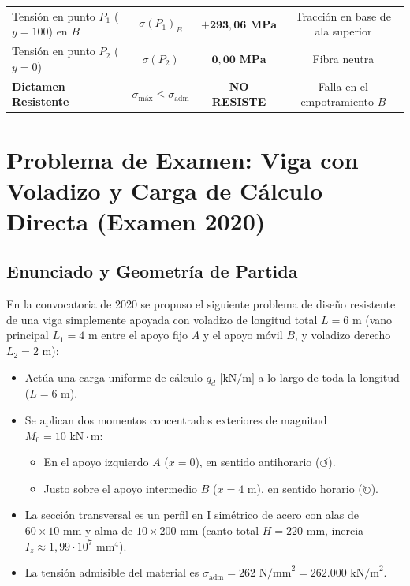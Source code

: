 \begin{table}[H]
{\begin{tabular}{lccc}
            Tensión en punto $P_1$ ($y = 100$) en $B$ & $\sigma(P_1)_B$ & $\mathbf{+293{,}06\text{ MPa}}$ & Tracción en base de ala superior \\
            Tensión en punto $P_2$ ($y = 0$) & $\sigma(P_2)$ & $\mathbf{0{,}00\text{ MPa}}$ & Fibra neutra \\
            \midrule
            \textbf{Dictamen Resistente} & $\sigma_{\text{máx}} \le \sigma_{\text{adm}}$ & \textbf{NO RESISTE} & Falla en el empotramiento $B$ \\
            \bottomrule
        \end{tabular}%
    }
    \label{tab:resumen_viga_apoyada_empotrada_triang}
\end{table}

\section{Problema de Examen: Viga con Voladizo y Carga de Cálculo Directa (Examen 2020)}

\subsection{Enunciado y Geometría de Partida}

En la convocatoria de 2020 se propuso el siguiente problema de diseño resistente de una viga simplemente apoyada con voladizo de longitud total $L = 6\text{ m}$ (vano principal $L_1 = 4\text{ m}$ entre el apoyo fijo $A$ y el apoyo móvil $B$, y voladizo derecho $L_2 = 2\text{ m}$):
\begin{itemize}
    \item Actúa una carga uniforme de cálculo $q_d\text{ [kN/m]}$ a lo largo de toda la longitud ($L = 6\text{ m}$).
    \item Se aplican dos momentos concentrados exteriores de magnitud $M_0 = 10\text{ kN}\cdot\text{m}$:
          \begin{itemize}
              \item En el apoyo izquierdo $A$ ($x = 0$), en sentido antihorario ($\circlearrowleft$).
              \item Justo sobre el apoyo intermedio $B$ ($x = 4\text{ m}$), en sentido horario ($\circlearrowright$).
          \end{itemize}
    \item La sección transversal es un perfil en I simétrico de acero con alas de $60 \times 10\text{ mm}$ y alma de $10 \times 200\text{ mm}$ (canto total $H = 220\text{ mm}$, inercia $I_z \approx 1{,}99 \cdot 10^7\text{ mm}^4$).
    \item La tensión admisible del material es $\sigma_{\text{adm}} = 262\text{ N/mm}^2 = 262.000\text{ kN/m}^2$.
\end{itemize}

